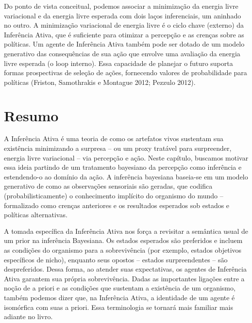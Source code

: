 \documentclass[
  12pt,
]{book}
\begin{document}
Do ponto de vista conceitual, podemos associar a minimização da energia livre variacional e da energia livre esperada com dois laços inferenciais, um aninhado no outro. A minimização variacional de energia livre é o ciclo chave (externo) da Inferência Ativa, que é suficiente para otimizar a percepção e as crenças sobre as políticas. Um agente de Inferência Ativa também pode ser dotado de um modelo generativo das consequências de sua ação que envolve uma avaliação da energia livre esperada (o loop interno). Essa capacidade de planejar o futuro suporta formas prospectivas de seleção de ações, fornecendo valores de probabilidade para políticas (Friston, Samothrakis e Montague 2012; Pezzulo 2012).

\hypertarget{resumo-1}{%
\section{Resumo}\label{resumo-1}}

A Inferência Ativa é uma teoria de como os artefatos vivos sustentam sua existência minimizando a surpresa -- ou um proxy tratável para surpreender, energia livre variacional -- via percepção e ação. Neste capítulo, buscamos motivar essa ideia partindo de um tratamento bayesiano da percepção como inferência e estendendo-o ao domínio da ação. A inferência bayesiana baseia-se em um modelo generativo de como as observações sensoriais são geradas, que codifica (probabilisticamente) o conhecimento implícito do organismo do mundo -- formalizado como crenças anteriores e os resultados esperados sob estados e políticas alternativas.

A tomada específica da Inferência Ativa nos força a revisitar a semântica usual de um prior na inferência Bayesiana. Os estados esperados são preferidos e incluem as condições do organismo para a sobrevivência (por exemplo, estados objetivos específicos de nicho), enquanto seus opostos -- estados surpreendentes -- são despreferidos. Dessa forma, ao atender suas expectativas, os agentes de Inferência Ativa garantem sua própria sobrevivência. Dadas as importantes ligações entre a noção de a priori e as condições que sustentam a existência de um organismo, também podemos dizer que, na Inferência Ativa, a identidade de um agente é isomórfica com suas a priori. Essa terminologia se tornará mais familiar mais adiante no livro.
\end{document}
